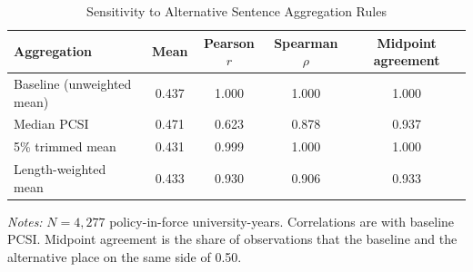 \begin{table}[htbp]
\centering
\small
\caption{Sensitivity to Alternative Sentence Aggregation Rules}
\label{tab:aggregation}
\begin{threeparttable}
\begin{tabular}{lcccc}
\toprule
Aggregation & Mean & Pearson $r$ & Spearman $\rho$ & Midpoint agreement \\
\midrule
Baseline (unweighted mean) & 0.437 & 1.000 & 1.000 & 1.000 \\
Median PCSI & 0.471 & 0.623 & 0.878 & 0.937 \\
5\% trimmed mean & 0.431 & 0.999 & 1.000 & 1.000 \\
Length-weighted mean & 0.433 & 0.930 & 0.906 & 0.933 \\
\bottomrule
\end{tabular}
\begin{tablenotes}[flushleft]\footnotesize
\item \textit{Notes:} $N = 4{,}277$ policy-in-force university-years. Correlations are with baseline PCSI. Midpoint agreement is the share of observations that the baseline and the alternative place on the same side of 0.50.
\end{tablenotes}
\end{threeparttable}
\end{table}
